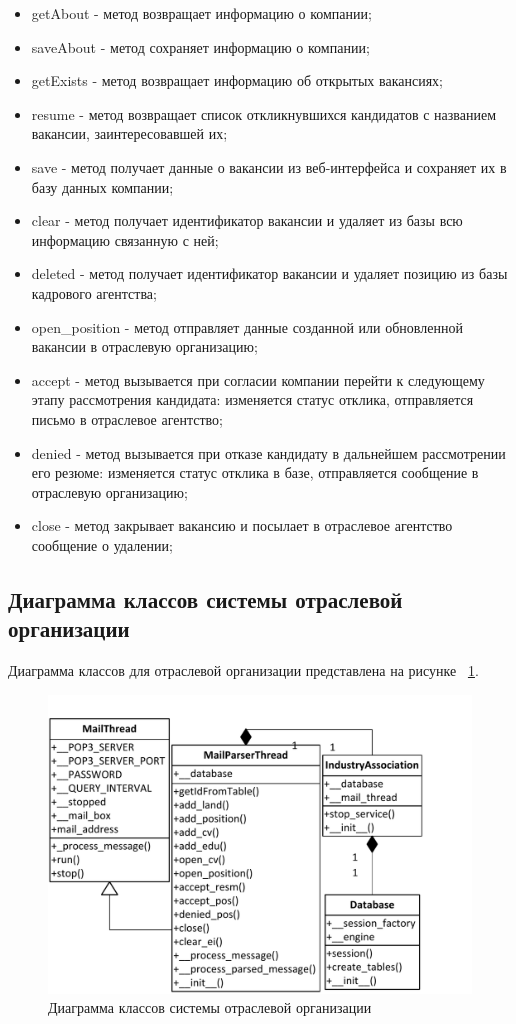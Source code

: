 \begin{itemize}
	\begin{itemize}
	\item getAbout - метод возвращает информацию о компании;
	\item saveAbout - метод сохраняет информацию о компании;
	\item getExists - метод возвращает информацию об открытых вакансиях;
	\item resume - метод возвращает список откликнувшихся кандидатов с названием вакансии, заинтересовавшей их;
	\item save - метод получает данные о вакансии из веб-интерфейса и сохраняет их в базу данных компании;
	\item clear - метод получает идентификатор вакансии и удаляет из базы всю информацию связанную с ней;
	\item deleted - метод получает идентификатор вакансии и удаляет позицию из базы кадрового агентства;
	\item open_position - метод отправляет данные созданной или обновленной вакансии в отраслевую организацию;
	\item accept - метод вызывается при согласии компании перейти к следующему этапу рассмотрения кандидата: изменяется статус отклика, отправляется письмо в отраслевое агентство;
	\item denied - метод вызывается при отказе кандидату в дальнейшем рассмотрении его резюме: изменяется статус отклика в базе, отправляется сообщение в отраслевую организацию;
	\item close - метод закрывает вакансию и посылает в отраслевое агентство сообщение о удалении;
	\end{itemize}	
\end{itemize}

\subsection{Диаграмма классов системы отраслевой организации}
Диаграмма классов для отраслевой организации представлена на рисунке ~\ref{fig:Visio-ia-uml}.


\begin{figure}[ht!]
\centering
 \includegraphics[width=\textwidth]{include/Visio-ia-uml.pdf}
\caption{Диаграмма классов системы отраслевой организации}
\label{fig:Visio-ia-uml}
\end{figure}

